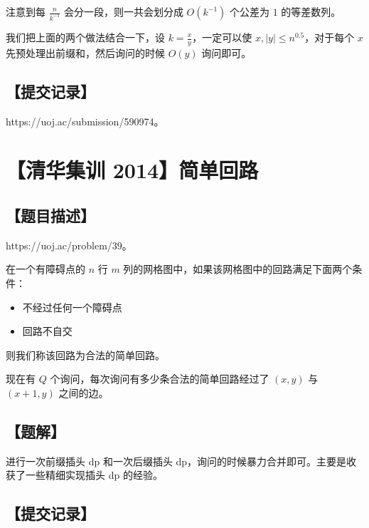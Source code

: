 \documentclass[UTF8,12pt,a4paper]{ctexart}
\begin{document}
	注意到每 $\frac{n}{k^{-1}}$ 会分一段，则一共会划分成 $O(k^{-1})$ 个公差为 $1$ 的等差数列。
	
	我们把上面的两个做法结合一下，设 $k=\frac xy$，一定可以使 $x,|y|\le n^{0.5}$，对于每个 $x$ 先预处理出前缀和，然后询问的时候 $O(y)$ 询问即可。
	
	\subsection*{【提交记录】}
	
	https://uoj.ac/submission/590974。
	
	
	\section*{【清华集训 2014】简单回路}
	
	\subsection*{【题目描述】}
	
	https://uoj.ac/problem/39。
	
	在一个有障碍点的 $n$ 行 $m$ 列的网格图中，如果该网格图中的回路满足下面两个条件：
	
	\begin{itemize}
		\item 不经过任何一个障碍点
		\item 回路不自交
	\end{itemize}
	
	则我们称该回路为合法的简单回路。
	
	现在有 $Q$ 个询问，每次询问有多少条合法的简单回路经过了 $(x,y)$ 与 $(x+1,y)$ 之间的边。
	
	\subsection*{【题解】}
	
	进行一次前缀插头 dp 和一次后缀插头 dp，询问的时候暴力合并即可。主要是收获了一些精细实现插头 dp 的经验。
	
	\subsection*{【提交记录】}
	
\end{document}
